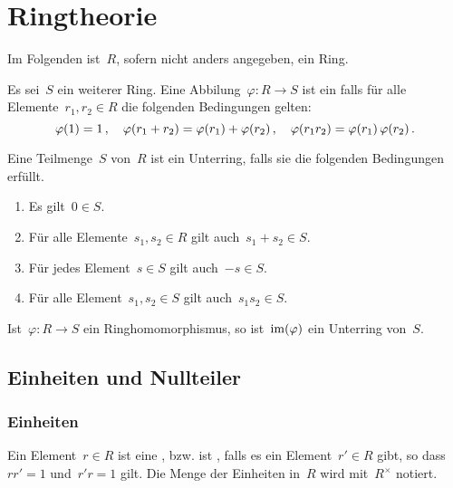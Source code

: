 \chapter{Ringtheorie}


\begin{convention}
  Im Folgenden ist~$R$, sofern nicht anders angegeben, ein Ring.
\end{convention}


\begin{definition}
  Es sei~$S$ ein weiterer Ring.
  Eine Abbilung~$\varphi \colon R \to S$ ist ein  falls für alle Elemente~$r_1, r_2 \in R$ die folgenden Bedingungen gelten:
  \[
    \varphi(1) = 1 \,,
    \quad
    \varphi(r_1 + r_2) = \varphi(r_1) + \varphi(r_2) \,,
    \quad
    \varphi(r_1 r_2) = \varphi(r_1) \, \varphi(r_2) \,.
  \]
\end{definition}

\begin{definition}
  Eine Teilmenge~$S$ von~$R$ ist ein Unterring, falls sie die folgenden Bedingungen erfüllt.
  \begin{enumerate}
    \item
      Es gilt~$0 \in S$.
    \item
      Für alle Elemente~$s_1, s_2 \in R$ gilt auch~$s_1 + s_2 \in S$.
    \item
      Für jedes Element~$s \in S$ gilt auch~$-s \in S$.
    \item
      Für alle Element~$s_1, s_2 \in S$ gilt auch~$s_1 s_2 \in S$.
  \end{enumerate}
\end{definition}

\begin{example}
  Ist~$\varphi \colon R \to S$ ein Ringhomomorphismus, so ist~$\operatorname{im}(\varphi)$ ein Unterring von~$S$.
\end{example}





\section{Einheiten und Nullteiler}



\subsection{Einheiten}

\begin{definition}
  Ein Element~$r \in R$ ist eine , bzw. ist , falls es ein Element~$r' \in R$ gibt, so dass~$r r' = 1$ und~$r' r = 1$ gilt.
  Die Menge der Einheiten in~$R$ wird mit~$R^\times$ notiert.
\end{definition}

